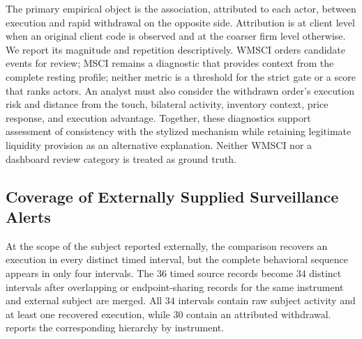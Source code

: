 \documentclass[11pt]{article}
\newenvironment{review}{\begingroup\color{blue}}{\endgroup}
\begin{document}
\begin{review}The primary empirical object is the association, attributed to each actor, between execution and rapid withdrawal on the opposite side. Attribution is at client level when an original client code is observed and at the coarser firm level otherwise.\end{review} We report
its magnitude and repetition descriptively. \begin{review}WMSCI orders candidate events for review; MSCI remains a diagnostic that provides context from the complete resting profile; neither metric is a threshold for the strict gate or a score that ranks actors.\end{review} An analyst must also
consider the withdrawn order's execution risk and distance from the touch, bilateral activity, inventory context, price
response, and execution advantage. Together, these diagnostics support assessment of consistency with the stylized mechanism
while retaining legitimate liquidity provision as an alternative explanation. Neither WMSCI nor a dashboard review category
is treated as ground truth.

\subsection{Coverage of Externally Supplied Surveillance Alerts}
\label{subsec:external_alert_results}

\begin{review}At the scope of the subject reported externally\end{review}, the comparison recovers an execution in every distinct timed interval,
but the complete behavioral sequence appears in only four intervals. The $36$ timed source records become $34$ distinct intervals
after overlapping or endpoint-sharing records for the same instrument and external subject are merged. All $34$ intervals
contain raw subject activity and at least one recovered execution, while $30$ contain an attributed withdrawal.
 reports the corresponding hierarchy by instrument.
\end{document}
